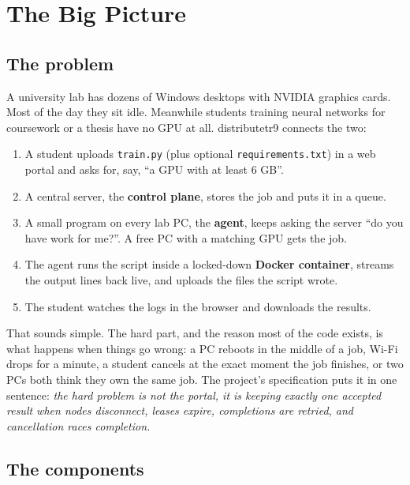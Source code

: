 \section{The Big Picture}

\subsection{The problem}

A university lab has dozens of Windows desktops with NVIDIA graphics cards.
Most of the day they sit idle. Meanwhile students training neural networks for
coursework or a thesis have no GPU at all. distributetr9 connects the two:

\begin{enumerate}
\item A student uploads \texttt{train.py} (plus optional \texttt{requirements.txt})
      in a web portal and asks for, say, ``a GPU with at least 6 GB''.
\item A central server, the \textbf{control plane}, stores the job and puts it
      in a queue.
\item A small program on every lab PC, the \textbf{agent}, keeps asking the
      server ``do you have work for me?''. A free PC with a matching GPU gets
      the job.
\item The agent runs the script inside a locked-down \textbf{Docker
      container}, streams the output lines back live, and uploads the files
      the script wrote.
\item The student watches the logs in the browser and downloads the results.
\end{enumerate}

That sounds simple. The hard part, and the reason most of the code exists, is
what happens when things go wrong: a PC reboots in the middle of a job, Wi-Fi
drops for a minute, a student cancels at the exact moment the job finishes, or
two PCs both think they own the same job. The project's specification puts it
in one sentence: \emph{the hard problem is not the portal, it is keeping exactly
one accepted result when nodes disconnect, leases expire, completions are
retried, and cancellation races completion.}

\subsection{The components}

